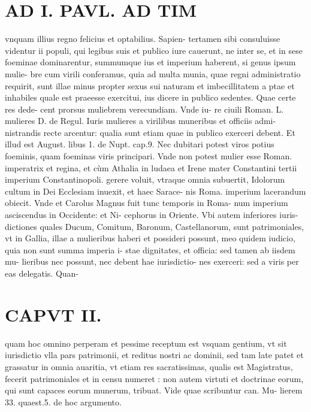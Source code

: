 \documentclass{article}
\begin{document}
\begin{pages}
\section*{AD I. PAVL. AD TIM }
\marginpar{[ p.86 ]}\pstart vnquam illius regno felicius et optabilius. Sapien- tertamen sibi consuluisse videntur ii populi, qui legibus suis et publico iure cauerunt, ne inter se, et in sese foeminae dominarentur, summumque ius et imperium haberent, si genus ipsum mulie- bre cum virili conferamus, quia ad multa munia, quae regni administratio requirit, sunt illae minus propter sexus sui naturam et imbecillitatem a ptae et inhabiles quale est praeesse exercitui, ius dicere in publico sedentes. Quae certe res dede- cent prorsus muliebrem verecundiam. Vnde iu- re ciuili Roman. L. mulieres D. de Regul. Iuris mulieres a virilibus muneribus et officiis admi- nistrandis recte arcentur: qualia sunt etiam quae in publico exerceri debent. Et illud est August. libus 1. de Nupt. cap.9. Nec dubitari potest viros potius foeminis, quam foeminas viris principari. Vnde non potest mulier esse Roman. imperatrix et regina, et cùm Athalia in ludaea et Irene mater Constantini tertii imperium Constantinopoli. gerere voluit, vtraque omnia subuertit, Idolorum cultum in Dei Ecclesiam inuexit, et haec Sarace- nis Roma. imperium lacerandum obiecit. Vnde et Carolus Magnus fuit tunc temporis in Roma- num imperium asciscendus in Occidente: et Ni- cephorus in Oriente. Vbi autem inferiores iuris- dictiones quales Ducum, Comitum, Baronum, Castellanorum, sunt patrimoniales, vt in Gallia, illae a mulieribus haberi et possideri possunt, meo quidem iudicio, quia non sunt summa imperia i- stae dignitates, et officia: sed tamen ab iisdem mu- lieribus nec possunt, nec debent hae iurisdictio- nes exerceri: sed a viris per eas delegatis. Quan-  \pend
\section*{CAPVT II. }
\marginpar{[ p.87 ]}\pstart quam hoc omnino perperam et pessime receptum est vsquam gentium, vt sit iurisdictio vlla pars patrimonii, et reditus nostri ac dominii, sed tam late patet et grassatur in omnia auaritia, vt etiam res sacratissimas, qualis est Magistratus, fecerit patrimoniales et in censu numeret : non autem virtuti et doctrinae eorum, qui sunt capaces eorum munerum, tribuat. Vide quae scribuntur can. Mu- lierem 33. quaest.5. de hoc argumento.  \pend
{}
{}

\end{pages}
\end{document}
